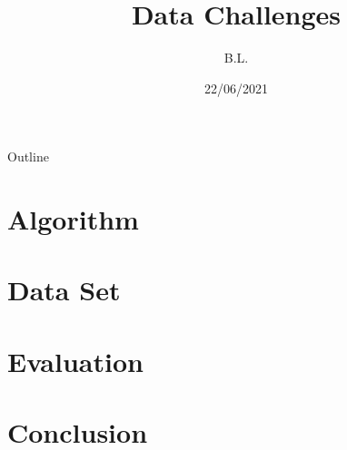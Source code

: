 \documentclass[aspectratio=43]{beamer}
\title[Data Challenges]{Data Challenges}
\author{B.L.}
\institute{Goethe Universität Frankfurt}
\date{22/06/2021}
\begin{document}
\begin{frame}
  \titlepage
\end{frame}

\begin{frame}{Outline}
  \tableofcontents
\end{frame}

\section{Algorithm}
\label{sec:algo}


\section{Data Set}
\label{sec:data}


\section{Evaluation}
\label{sec:eval}


\section{Conclusion}
\label{sec:conclustion}

\end{document}
